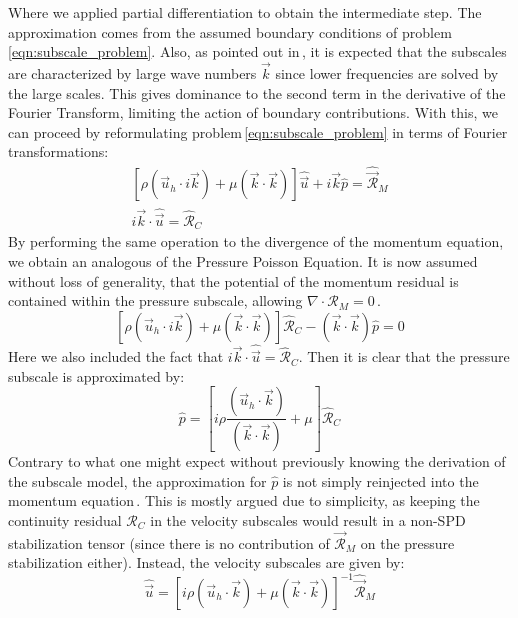 Where we applied partial differentiation to obtain the intermediate step. The approximation comes from the assumed boundary conditions of problem\,\eqref{eqn:subscale_problem}. Also, as pointed out in\,\cite{Codina2002}, it is expected that the subscales are characterized by large wave numbers $\vec{k}$ since lower frequencies are solved by the large scales. This gives dominance to the second term in the derivative of the Fourier Transform, limiting the action of boundary contributions. With this, we can proceed by reformulating problem\,\eqref{eqn:subscale_problem} in terms of Fourier transformations:
\begin{equation*}
	\begin{split}
		\left[\rho(\vec{u}_{h}\cdot i\vec{k}) + \mu(\vec{k}\cdot\vec{k})\right]\hat{\vec{u}} + i\vec{k} \hat{p} = \hat{\vec{\mathcal{R}}}_M\\
		i\vec{k} \cdot \hat{\vec{u}} = \hat{\mathcal{R}}_C
	\end{split}
\end{equation*}
By performing the same operation to the divergence of the momentum equation, we obtain an analogous of the Pressure Poisson Equation. It is now assumed without loss of generality, that the potential of the momentum residual is contained within the pressure subscale, allowing $\nabla\cdot\mathcal{R}_M = 0$\,\cite{Codina2002}.
\begin{equation*}
	\left[\rho(\vec{u}_{h}\cdot i\vec{k}) + \mu(\vec{k}\cdot\vec{k})\right]\hat{\mathcal{R}}_C - (\vec{k}\cdot\vec{k}) \hat{p} = 0
\end{equation*}
Here we also included the fact that $i\vec{k} \cdot \hat{\vec{u}} = \hat{\mathcal{R}}_C$. Then it is clear that the pressure subscale is approximated by:
\begin{equation*}
	\hat{p} = \left[i\rho\frac{(\vec{u}_{h}\cdot \vec{k})}{(\vec{k}\cdot\vec{k})} + \mu\right]\hat{\mathcal{R}}_C
\end{equation*}
Contrary to what one might expect without previously knowing the derivation of the subscale model, the approximation for $\hat{p}$ is not simply reinjected into the momentum equation\,\cite{Codina2002}. This is mostly argued due to simplicity, as keeping the continuity residual $\mathcal{R}_C$ in the velocity subscales would result in a non-SPD stabilization tensor (since there is no contribution of $\vec{\mathcal{R}}_M$ on the pressure stabilization either). Instead, the velocity subscales are given by:
\begin{equation*}
	\hat{\vec{u}}  = {\left[{i\rho(\vec{u}_{h}\cdot \vec{k}) + \mu(\vec{k}\cdot\vec{k})}\right]}^{-1}{\hat{\vec{\mathcal{R}}}}_M
\end{equation*}
